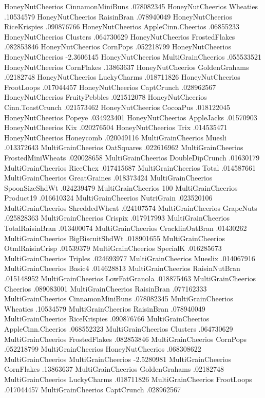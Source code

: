 HoneyNutCheerios	CinnamonMiniBuns	.078082345
HoneyNutCheerios	Wheaties	.10534579
HoneyNutCheerios	RaisinBran	.078940049
HoneyNutCheerios	RiceKrispies	.090876766
HoneyNutCheerios	AppleCinn.Cheerios	.06855233
HoneyNutCheerios	Clusters	.064730629
HoneyNutCheerios	FrostedFlakes	.082853846
HoneyNutCheerios	CornPops	.052218799
HoneyNutCheerios	HoneyNutCheerios	-2.3606145
HoneyNutCheerios	MultiGrainCheerios	.055533521
HoneyNutCheerios	CornFlakes	.13863637
HoneyNutCheerios	GoldenGrahams	.02182748
HoneyNutCheerios	LuckyCharms	.018711826
HoneyNutCheerios	FrootLoops	.017044457
HoneyNutCheerios	CaptCrunch	.028962567
HoneyNutCheerios	FruityPebbles	.021512078
HoneyNutCheerios	Cinn.ToastCrunch	.021573462
HoneyNutCheerios	CocoaPus	.018122045
HoneyNutCheerios	Popeye	.034923401
HoneyNutCheerios	AppleJacks	.01570903
HoneyNutCheerios	Kix	.020276504
HoneyNutCheerios	Trix	.014535471
HoneyNutCheerios	Honeycomb	.020049116
MultiGrainCheerios	Muesli	.013372643
MultiGrainCheerios	OatSquares	.022616962
MultiGrainCheerios	FrostedMiniWheats	.020028658
MultiGrainCheerios	DoubleDipCrunch	.01630179
MultiGrainCheerios	RiceChex	.017415687
MultiGrainCheerios	Total	.014587661
MultiGrainCheerios	GreatGraines	.018373424
MultiGrainCheerios	SpoonSizeShdWt	.024239479
MultiGrainCheerios	100%
MultiGrainCheerios	Product19	.016610324
MultiGrainCheerios	NutriGrain	.023520106
MultiGrainCheerios	ShreddedWheat	.024107574
MultiGrainCheerios	GrapeNuts	.025828363
MultiGrainCheerios	Crispix	.017917993
MultiGrainCheerios	TotalRaisinBran	.013400074
MultiGrainCheerios	CracklinOatBran	.01430262
MultiGrainCheerios	BigBiscuitShdWt	.018901655
MultiGrainCheerios	OtmlRaisinCrisp	.01539379
MultiGrainCheerios	SpecialK	.016285673
MultiGrainCheerios	Triples	.024693977
MultiGrainCheerios	Mueslix	.014067916
MultiGrainCheerios	Basic4	.014628813
MultiGrainCheerios	RaisinNutBran	.015148952
MultiGrainCheerios	LowFatGranola	.018875463
MultiGrainCheerios	Cheerios	.089083001
MultiGrainCheerios	RaisinBran	.077162333
MultiGrainCheerios	CinnamonMiniBuns	.078082345
MultiGrainCheerios	Wheaties	.10534579
MultiGrainCheerios	RaisinBran	.078940049
MultiGrainCheerios	RiceKrispies	.090876766
MultiGrainCheerios	AppleCinn.Cheerios	.068552323
MultiGrainCheerios	Clusters	.064730629
MultiGrainCheerios	FrostedFlakes	.082853846
MultiGrainCheerios	CornPops	.052218799
MultiGrainCheerios	HoneyNutCheerios	.068308622
MultiGrainCheerios	MultiGrainCheerios	-2.5280981
MultiGrainCheerios	CornFlakes	.13863637
MultiGrainCheerios	GoldenGrahams	.02182748
MultiGrainCheerios	LuckyCharms	.018711826
MultiGrainCheerios	FrootLoops	.017044457
MultiGrainCheerios	CaptCrunch	.028962567
